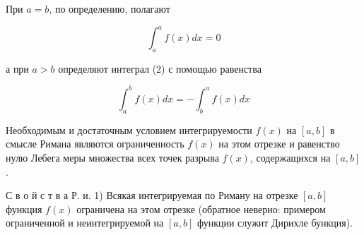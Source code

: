\documentclass[10pt]{article}
\begin{document}
При $a=b$, по определению, полагают



\[

\int_{a}^{a} f(x) d x=0

\]



а при $a>b$ определяют интеграл (2) с помощью равенства



\[

\int_{a}^{b} f(x) d x=-\int_{b}^{a} f(x) d x

\]



Необходимым и достаточным условием интегрируемости $f(x)$ на $[a, b]$ в смысле Римана являются ограниченность $f(x)$ на этом отрезке и равенство нулю Лебега меры множества всех точек разрыва $f(x)$, содержащихся на $[a, b]$.



С в о й с т в а Р. и. 1) Всякая интегрируемая по Риману на отрезке $[a, b]$ функция $f(x)$ ограничена на этом отрезке (обратное неверно: примером ограниченной и неинтегрируемой на $[a, b]$ функции служит Дирихле бункция).
\end{document}
